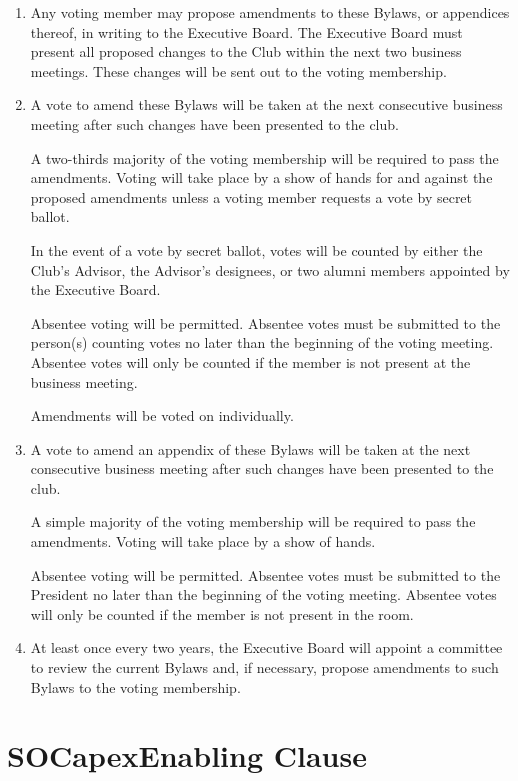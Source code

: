 \documentclass[12pt,letterpaper,oneside]{book}
\begin{document}
\begin{enumerate}

\item Any voting member may propose amendments to these Bylaws, or appendices thereof, in writing to the Executive Board. The Executive Board must present all proposed changes to the Club within the next two business meetings. These changes will be sent out to the voting membership.
\item A vote to amend these Bylaws will be taken at the next consecutive business meeting after such changes have been presented to the club.

\subitem A two-thirds majority of the voting membership will be required to pass the amendments. Voting will take place by a show of hands for and against the proposed amendments unless a voting member requests a vote by secret ballot.

\subitem In the event of a vote by secret ballot, votes will be counted by either the Club’s Advisor, the Advisor’s designees, or two alumni members appointed by the Executive Board.

\subitem Absentee voting will be permitted. Absentee votes must be submitted to the person(s) counting votes no later than the beginning of the voting meeting. Absentee votes will only be counted if the member is not present at the business meeting.

\subitem Amendments will be voted on individually.

\item A vote to amend an appendix of these Bylaws will be taken at the next consecutive business meeting after such changes have been presented to the club.

\subitem A simple majority of the voting membership will be required to pass the amendments. Voting will take place by a show of hands.

\subitem Absentee voting will be permitted. Absentee votes must be submitted to the President no later than the beginning of the voting meeting. Absentee votes will only be counted if the member is not present in the room.

\item At least once every two years, the Executive Board will appoint a committee to review the current Bylaws and, if necessary, propose amendments to such Bylaws to the voting membership.

\end{enumerate}

\chapter{SOCapexEnabling Clause}
\end{document}
